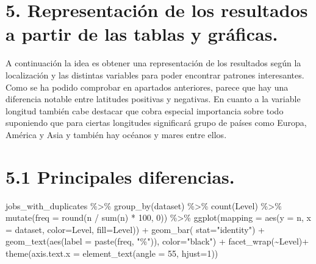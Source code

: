 \documentclass[
]{article}
\newenvironment{Shaded}{\begin{snugshade}}{\end{snugshade}}
\newcommand{\DataTypeTok}[1]{\textcolor[rgb]{0.87,0.87,0.75}{#1}}
\newcommand{\DecValTok}[1]{\textcolor[rgb]{0.86,0.86,0.80}{#1}}
\newcommand{\KeywordTok}[1]{\textcolor[rgb]{0.94,0.87,0.69}{#1}}
\newcommand{\NormalTok}[1]{\textcolor[rgb]{0.80,0.80,0.80}{#1}}
\newcommand{\OperatorTok}[1]{\textcolor[rgb]{0.94,0.94,0.82}{#1}}
\newcommand{\StringTok}[1]{\textcolor[rgb]{0.80,0.58,0.58}{#1}}
\begin{document}
\hypertarget{representaciuxf3n-de-los-resultados-a-partir-de-las-tablas-y-gruxe1ficas.}{%
\section{5. Representación de los resultados a partir de las tablas y
gráficas.}\label{representaciuxf3n-de-los-resultados-a-partir-de-las-tablas-y-gruxe1ficas.}}

A continuación la idea es obtener una representación de los resultados
según la localización y las distintas variables para poder encontrar
patrones interesantes. Como se ha podido comprobar en apartados
anteriores, parece que hay una diferencia notable entre latitudes
positivas y negativas. En cuanto a la variable longitud también cabe
destacar que cobra especial importancia sobre todo suponiendo que para
ciertas longitudes significará grupo de países como Europa, América y
Asia y también hay océanos y mares entre ellos.

\hypertarget{principales-diferencias.}{%
\section{5.1 Principales diferencias.}\label{principales-diferencias.}}

\begin{Shaded}
\begin{Highlighting}[]
\NormalTok{jobs\_with\_duplicates }\OperatorTok{\%\textgreater{}\%}\StringTok{ }
\StringTok{  }\KeywordTok{group\_by}\NormalTok{(dataset) }\OperatorTok{\%\textgreater{}\%}\StringTok{ }
\StringTok{  }\KeywordTok{count}\NormalTok{(Level) }\OperatorTok{\%\textgreater{}\%}
\StringTok{  }\KeywordTok{mutate}\NormalTok{(}\DataTypeTok{freq =} \KeywordTok{round}\NormalTok{(n }\OperatorTok{/}\StringTok{ }\KeywordTok{sum}\NormalTok{(n) }\OperatorTok{*}\StringTok{ }\DecValTok{100}\NormalTok{, }\DecValTok{0}\NormalTok{)) }\OperatorTok{\%\textgreater{}\%}\StringTok{ }
\StringTok{  }\KeywordTok{ggplot}\NormalTok{(}\DataTypeTok{mapping =} \KeywordTok{aes}\NormalTok{(}\DataTypeTok{y =}\NormalTok{ n, }\DataTypeTok{x =}\NormalTok{ dataset, }\DataTypeTok{color=}\NormalTok{Level, }\DataTypeTok{fill=}\NormalTok{Level)) }\OperatorTok{+}\StringTok{ }\KeywordTok{geom\_bar}\NormalTok{( }\DataTypeTok{stat=}\StringTok{"identity"}\NormalTok{) }\OperatorTok{+}\StringTok{ }\KeywordTok{geom\_text}\NormalTok{(}\KeywordTok{aes}\NormalTok{(}\DataTypeTok{label =} \KeywordTok{paste}\NormalTok{(freq, }\StringTok{"\%"}\NormalTok{)), }\DataTypeTok{color=}\StringTok{"black"}\NormalTok{) }\OperatorTok{+}\StringTok{ }\KeywordTok{facet\_wrap}\NormalTok{(}\OperatorTok{\textasciitilde{}}\NormalTok{Level)}\OperatorTok{+}\StringTok{ }\KeywordTok{theme}\NormalTok{(}\DataTypeTok{axis.text.x =} \KeywordTok{element\_text}\NormalTok{(}\DataTypeTok{angle =} \DecValTok{55}\NormalTok{, }\DataTypeTok{hjust=}\DecValTok{1}\NormalTok{))}
\end{Highlighting}
\end{Shaded}
\end{document}
